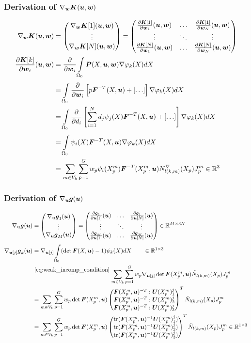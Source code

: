 \subsubsection{Derivation of $\nabla_{\vw}\vK(\vu,\vw)$}
\begin{align*}
	\nabla_{\vw}\vK(\vu,\vw) &= \m{\nabla_{\vw}\vK[1](\vu,\vw)\\ \vdots \\ \nabla_{\vw}\vK[N](\vu,\vw)}
	 = \m{\d{\vK[1]}{\vw_1}(\vu,\vw) & \ldots & \d{\vK[1]}{\vw_N}(\vu,\vw)\\
	 	\vdots & \ddots & \vdots\\
	   \d{\vK[N]}{\vw_1}(\vu,\vw) & \ldots & \d{\vK[N]}{\vw_N}(\vu,\vw)}\\
	\d{\vK[k]}{\vw_i}(\vu,\vw) &= \d{}{\vw_i} \intor\vP(X,\vu,\vw)\dpk dX\\
		&=  \intor\d{}{\vw_i} \left[p\vF^{-T}(X,\vu) +[\ldots] \right] \dpk dX\\
		&=  \intor\d{}{d_i} \left[\sumi d_j\psi_j(X)\vF^{-T}(X,\vu) +[\ldots] \right] \dpk dX\\
		&=  \intor \psi_i(X)\vF^{-T}(X,\vu)\dpk dX\\
		&= \sumvk\sumgp w_p \psi_i(\pmp)\vF^{-T}(\pmp,\vu) \dNkmp\jmp\in\R^3
\end{align*}

\subsubsection{Derivation of $\nabla_{\vu}\vg(\vu)$}
\begin{align*}
	\nabla_{\vu}\vg(\vu) &= \m{\nabla_{\vu}\vg_1(\vu)\\ \vdots \\ \nabla_{\vu}\vg_M(\vu)}
	 = \m{\d{\vg_1}{\vu[1]}(\vu) & \ldots & \d{\vg_1}{\vu[N]}(\vu)\\
	 	\vdots & \ddots & \vdots\\
	   \d{\vg_M}{\vu[1]}(\vu) & \ldots & \d{\vg_M}{\vu[N]}(\vu)} \in\R^{M \times 3N}\\
	\nabla_{\vu[j]}\vg_k(\vu) &= \nabla_{\vu[j]}\intor (\det\vF(X,\vu)-1)\psi_k(X)dX\qquad\in\R^{1\times 3}\\
		&\re{eq:weak_incomp_condition}  \sumvk\sumgp w_p \nabla_{\vu[j]}\det\vF(\pmp,\vu)\bPkmp\jmp\\
		&= \sumvk\sumgp w_p \det\vF(\pmp,\vu)\m{\vF(\pmp,\vu)^{-T}:\vU(\pmp)^j_1\\\vF(\pmp,\vu)^{-T}:\vU(\pmp)^j_2\\\vF(\pmp,\vu)^{-T}:\vU(\pmp)^j_3}^T\bPkmp\jmp\\
		&= \sumvk\sumgp w_p \det\vF(\pmp,\vu)\m{\tr(\vF(\pmp,\vu)^{-1}\vU(\pmp)^j_1)\\\tr(\vF(\pmp,\vu)^{-1}\vU(\pmp)^j_2)\\\tr(\vF(\pmp,\vu)^{-1}\vU(\pmp)^j_3)}^T\bPkmp\jmp\in\R^{1\times 3}
\end{align*}



